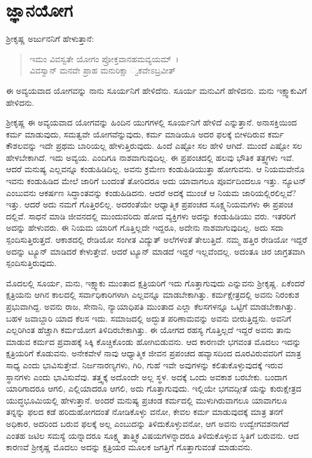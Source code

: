 
\chapter{ಜ್ಞಾನಯೋಗ}

ಶ‍್ರೀಕೃಷ್ಣ ಅರ್ಜುನನಿಗೆ ಹೇಳುತ್ತಾನೆ:

\begin{verse}
ಇಮಂ ವಿವಸ್ವತೇ ಯೋಗಂ ಪ್ರೋಕ್ತವಾನಹಮವ್ಯಯಮ್~।\\ವಿವಸ್ವಾನ್ ಮನವೇ ಪ್ರಾಹ ಮನುರಿಕ್ಷಾ ್ವಕವೇಽಬ್ರವೀತ್ 
\end{verse}

{\small ಈ ಅವ್ಯಯವಾದ ಯೋಗವನ್ನು ನಾನು ಸೂರ್ಯನಿಗೆ ಹೇಳಿದೆನು. ಸೂರ್ಯ ಮನುವಿಗೆ ಹೇಳಿದನು. ಮನು ಇಕ್ಷ್ವಾಕುವಿಗೆ ಹೇಳಿದನು.}

ಶ‍್ರೀಕೃಷ್ಣ ಈ ಅವ್ಯಯವಾದ ಯೋಗವನ್ನು ಹಿಂದಿನ ಯುಗಗಳಲ್ಲಿ ಸೂರ್ಯನಿಗೆ ಹೇಳಿದೆ ಎನ್ನುತ್ತಾನೆ. ಅನಾಸಕ್ತಿಯಿಂದ ಕರ್ಮ ಮಾಡುವುದು, ಸಮತ್ವವೇ ಯೋಗವೆನ್ನುವುದು, ಕರ್ಮ ಮಾಡಿಯೂ ಅದರ ಫಲಕ್ಕೆ ಬೀಳದಿರುವ ಕರ್ಮ ಕೌಶಲವನ್ನು ಇದೇ ಪ್ರಥಮ ಬಾರಿಯಲ್ಲ ಹೇಳುತ್ತಿರುವುದು. ಹಿಂದೆ ಎಷ್ಟೋ ಸಲ ಹೇಳಿ ಆಗಿದೆ. ಮುಂದೆ ಎಷ್ಟೋ ಸಲ ಹೇಳಬೇಕಾಗಿದೆ. ಇದು ಅವ್ಯಯ. ಎಂದಿಗೂ ನಾಶವಾಗುವುದಿಲ್ಲ. ಈ ಪ್ರಪಂಚದಲ್ಲಿ ಹಲವು ಭೌತಿಕ ತತ್ತ್ವಗಳು ಇವೆ. ಆದರೆ ಮನುಷ್ಯ ಎಲ್ಲವನ್ನೂ ಕಂಡುಹಿಡಿದಿಲ್ಲ. ಅವನು ಕ್ರಮೇಣ ಕಂಡುಹಿಡಿಯುತ್ತಾ ಹೋಗುವನು. ಆ ನಿಯಮವೇನೊ ಇವನು ಕಂಡುಹಿಡಿದ ಮೇಲೆ ಜಾರಿಗೆ ಬಂದಂತೆ ತೋರಿದರೂ ಅದು ಯಾವಾಗಲೂ ಪೂರ್ವದಿಂದಲೂ ಇತ್ತು. ನ್ಯೂಟನ್ ಎಂಬುವನು ಆಕರ್ಷಣ ಸಿದ್ಧಾಂತವನ್ನು ಕಂಡುಹಿಡಿದನು. ಆದರೆ ಅದಕ್ಕೆ ಮುಂಚೆ ಆ ನಿಯಮ ಜಾರಿಯಲ್ಲಿರಲಿಲ್ಲವೆ? ಇತ್ತು. ಆದರೆ ಅದು ನಮಗೆ ಗೊತ್ತಿರಲಿಲ್ಲ. ಅದರಂತೆಯೇ ಆಧ್ಯಾತ್ಮಿಕ ಪ್ರಪಂಚದ ಸೂಕ್ಷ್ಮನಿಯಮಗಳು ಈ ಪ್ರಪಂಚ ದಲ್ಲಿವೆ. ಸಾಧನೆ ಮಾಡಿ ಜೀವನದಲ್ಲಿ ಮುಂದುವರಿದು ಹೋದ ವ್ಯಕ್ತಿಗಳು ಅದನ್ನು ಕಂಡುಹಿಡಿಯು ವರು. ಇತರರಿಗೆ ಅದನ್ನು ಹೇಳುವರು. ಈ ನಿಯಮ ಯಾರಿಗೆ ಗೊತ್ತಿಲ್ಲದೇ ಇದ್ದರೂ, ಅದೇನು ನಾಶವಾಗುವುದಿಲ್ಲ. ಅದು ಸದಾ ಸ್ಪಂದಿಸುತ್ತಿರುತ್ತದೆ. ಆಕಾಶದಲ್ಲಿ ರೇಡಿಯೋ ಸಂಗೀತ ವಿದ್ಯುತ್ ಅಲೆಗಳಂತೆ ತೇಲುತ್ತಿದೆ. ನಮ್ಮ ಹತ್ತಿರ ರೇಡಿಯೋ ಇದ್ದರೆ ಅದನ್ನು ಟ್ಯೂನ್ ಮಾಡಿದರೆ ಕೇಳುತ್ತೇವೆ. ಆದರೆ ಟ್ಯೂನ್ ಮಾಡದೆ ಇದ್ದರೆ ಇಲ್ಲವೆಂದಲ್ಲ. ಅದಂತೂ ಚಿರ ಜಾಗ್ರತವಾಗಿ ಸ್ಪಂದಿಸುತ್ತಿರುವುದು.

ಮೊದಲಲ್ಲಿ ಸೂರ್ಯ, ಮನು, ಇಕ್ಷ್ವಾಕು ಮುಂತಾದ ಕ್ಷತ್ರಿಯರಿಗೆ ಇದು ಗೊತ್ತಾಗುವುದು ಎನ್ನುವನು ಶ‍್ರೀಕೃಷ್ಣ. ಏಕೆಂದರೆ ಕ್ಷತ್ರಿಯನು ಆಗಿನ ಕಾಲದಲ್ಲಿ ಸರ್ವಾಧಿಕಾರಿಗಳಾಗಿ ಎಲ್ಲವನ್ನೂ ಮಾಡಬೇಕಾಗಿತ್ತು. ಕರ್ಮಕ್ಷೇತ್ರದಲ್ಲಿ ಅವನು ನಿರಂಕುಶ ಪ್ರಭುವಾಗಿದ್ದ. ಅವನು ರಾಜ, ಸೇನಾನಿ, ನ್ಯಾಯಾಧಿಪತಿ ಮುಂತಾದ ಎಲ್ಲಾ ಕೆಲಸಗಳನ್ನೂ ಒಟ್ಟಿಗೆ ಮಾಡಬೇಕಾಗಿತ್ತು. ಬಹಳ ಜವಾಬ್ದಾರಿ ಯಾದ ಕೆಲಸ ಇದು. ಸಮಾಜದಲ್ಲಿ ಅದ್ಭುತ ಪರಿಣಾಮವನ್ನು ಅವನು ಬೀರುತ್ತಿದ್ದನು. ಅವನಿಗೆ ಎಲ್ಲರಿಗಿಂತ ಹೆಚ್ಚಾಗಿ ಕರ್ಮಯೋಗ ತಿಳಿದಿರಬೇಕಾಗಿತ್ತು. ಈ ಯೋಗದ ರಹಸ್ಯ ಗೊತ್ತಿಲ್ಲದೆ ಇದ್ದರೆ ಅವನು ತಾನು ಮಾಡುವ ಕರ್ಮದ ಪ್ರವಾಹಕ್ಕೆ ಸಿಕ್ಕಿ ಕೊಚ್ಚಿಕೊಂಡು ಹೋಗಿಬಿಡುವನು. ಆದ ಕಾರಣವೇ ಭಗವಂತ ಮೊದಲು ಇದನ್ನು ಕ್ಷತ್ರಿಯರಿಗೆ ಕೊಡುವನು. ಅನೇಕವೇಳೆ ನಾವು ಆಧ್ಯಾತ್ಮಿಕ ಜೀವನ ಪ್ರಪಂಚದ ಹವ್ಯಾಸದಿಂದ ದೂರವಿರುವವರಿಗೆ ಮಾತ್ರ ಸಾಧ್ಯ ಎಂದು ಭಾವಿಸುತ್ತೇವೆ. ನಿರ್ಜನಾರಣ್ಯಗಳು, ಗಿರಿ, ಗುಹೆ ಇವೇ ಅವುಗಳನ್ನು ಕಲಿತುಕೊಳ್ಳುವುದಕ್ಕೆ ಇರುವ ಸ್ಥಾನಗಳು ಎಂದು ಭಾವಿಸುವೆವು. ತತ್ತ್ವಕ್ಕೆ ಅದೊಂದೇ ಅಲ್ಲ ಸ್ಥಳ. ಅದಕ್ಕೆ ಒಂದು ಅವಕಾಶ ಬರಬೇಕು. ಬಂದಾಗ ಯಾರಿಗಾದರೂ ಆಗಲಿ, ಎಲ್ಲಿಯಾದರೂ ಆಗಲಿ, ಅದು ಗೊತ್ತಾಗುವುದು. ಇಲ್ಲಿಯೇ ಭಗವದ್ಗೀತೆ ಯನ್ನು ಕುರುಕ್ಷೇತ್ರದ ಯುದ್ಧಭೂಮಿಯಲ್ಲಿ ಹೇಳುತ್ತಾನೆ. ಅಂದರೆ ಮನುಷ್ಯ ಪ್ರಚಂಡ ಕರ್ಮದಲ್ಲಿ ಮುಳುಗಿರುವಾಗಲೂ ಯಾವಾಗಲೂ ತನ್ನನ್ನು ಫಲದ ಕಡೆ ಹರಿದುಹೋಗದಂತೆ ನೋಡಿಕೊಳ್ಳು ವನೋ, ಕೇವಲ ಕರ್ಮ ಮಾಡುವುದಕ್ಕೆ ಮಾತ್ರ ತನಗೆ ಅಧಿಕಾರ, ಅದರಿಂದ ಬರುವ ಫಲಕ್ಕೆ ಅಲ್ಲ ಎಂಬುದನ್ನು ತಿಳಿದುಕೊಳ್ಳುವನೋ, ಆಗ ಅವನು ಉದ್ವೇಗವಶನಾಗದೆ ಎಂತಹ ಜಟಿಲ ಸಮಸ್ಯೆ ಯನ್ನಾದರೂ ಸೂಕ್ಷ್ಮ ತಾತ್ತ್ವಿಕ ವಿಷಯಗಳನ್ನಾದರೂ ತಿಳಿದುಕೊಳ್ಳುವ ಸ್ಥಿತಿಗೆ ಬರುವನು. ಆದ ಕಾರಣವೆ ಶ‍್ರೀಕೃಷ್ಣ ಮೊದಲು ಅದನ್ನು ಕ್ಷತ್ರಿಯರ ಮೂಲಕ ಜಗತ್ತಿಗೆ ಗೊತ್ತಾಗುವಂತೆ ಮಾಡುವನು.

